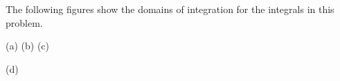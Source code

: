\begin{solution}
The following figures show the domains of integration for the
integrals in this problem.
\begin{center}
  (a) \qquad
  (b) \qquad
  (c)             
\end{center}
\begin{center}
  (d) \qquad

\end{center}
\end{solution}
